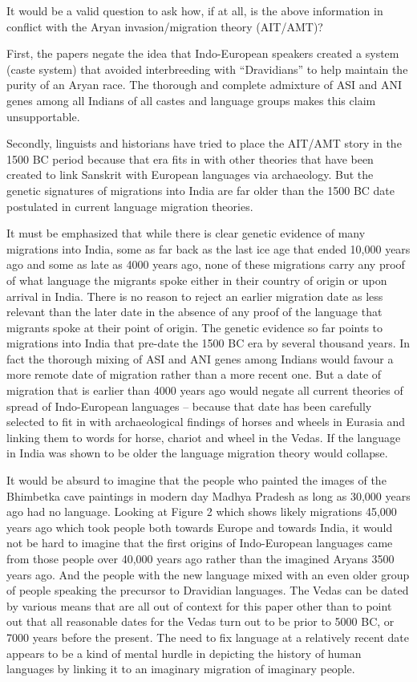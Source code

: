 It would be a valid question to ask how, if at all, is the above information in conflict with the Aryan invasion/migration theory (AIT/AMT)?

First, the papers negate the idea that Indo-European speakers created a system (caste system) that avoided interbreeding with “Dravidians” to help maintain the purity of an Aryan race. The thorough and complete admixture of ASI and ANI genes among all Indians of all castes and language groups makes this claim unsupportable.

Secondly, linguists and historians have tried to place the AIT/AMT story in the 1500 BC period because that era fits in with other theories that have been created to link Sanskrit with European languages via archaeology. But the genetic signatures of migrations into India are far older than the 1500 BC date postulated in current language migration theories.

It must be emphasized that while there is clear genetic evidence of many migrations into India, some as far back as the last ice age that ended 10,000 years ago and some as late as 4000 years ago, none of these migrations carry any proof of what language the migrants spoke either in their country of origin or upon arrival in India. There is no reason to reject an earlier migration date as less relevant than the later date in the absence of any proof of the language that migrants spoke at their point of origin. The genetic evidence so far points to migrations into India that pre-date the 1500 BC era by several thousand years. In fact the thorough mixing of ASI and ANI genes among Indians would favour a more remote date of migration rather than a more recent one. But a date of migration that is earlier than 4000 years ago would negate all current theories of spread of Indo-European languages – because that date has been carefully selected to fit in with archaeological findings of horses and wheels in Eurasia and linking them to words for horse, chariot and wheel in the Vedas. If the language in India was shown to be older the language migration theory would collapse.

It would be absurd to imagine that the people who painted the images of the Bhimbetka cave paintings in modern day Madhya Pradesh as long as 30,000 years ago had no language. Looking at Figure 2 which shows likely migrations 45,000 years ago which took people both towards Europe and towards India, it would not be hard to imagine that the first origins of Indo-European languages came from those people over 40,000 years ago rather than the imagined Aryans 3500 years ago. And the people with the new language mixed with an even older group of people speaking the precursor to Dravidian languages. The Vedas can be dated by various means that are all out of context for this paper other than to point out that all reasonable dates for the Vedas turn out to be prior to 5000 BC, or 7000 years before the present. The need to fix language at a relatively recent date appears to be a kind of mental hurdle in depicting the history of human languages by linking it to an imaginary migration of imaginary people.

